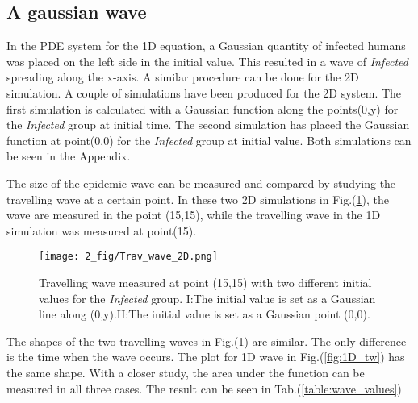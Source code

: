 \documentclass[%
twoside,                 %
final,                   %
chapterprefix=true,      %
open=right               %
10pt]{book}
\begin{document}
\subsection{A gaussian wave}
In the PDE system for the 1D equation, a Gaussian quantity of infected humans was placed on the left side in the initial value. This resulted in a wave of \emph{Infected} spreading along the x-axis. A similar procedure can be done for the 2D simulation. A couple of simulations have been produced for the 2D system. The first simulation is calculated with a Gaussian function along the points(0,y) for the \emph{Infected} group at initial time. The second simulation has placed the Gaussian function at point(0,0) for the \emph{Infected} group at initial value. Both simulations can be seen in the Appendix.  


\vspace{3mm}




\vspace{3mm}


The size of the epidemic wave can be measured and compared by studying the travelling wave at a certain point. In these two 2D simulations in Fig.(\ref{fig:2D_trav_wave}), the wave are measured in the point (15,15), while the travelling wave in the 1D simulation was measured at point(15). 


\begin{figure}[ht]
  \centerline{\texttt{[image: 2\_fig/Trav\_wave\_2D.png]}}
  \caption{
  \label{fig:2D_trav_wave} Travelling wave measured at point (15,15) with two different initial values for the \emph{Infected} group. I:The initial value is set as a Gaussian line along (0,y).II:The initial value is set as a Gaussian point (0,0).
  }
\end{figure}




\vspace{3mm}




\vspace{3mm}


The shapes of the two travelling waves in Fig.(\ref{fig:2D_trav_wave}) are similar. The only difference is the time when the wave occurs. The plot for 1D wave in Fig.(\ref{fig:1D_tw}) has the same shape. With a closer study, the area under the function can be measured in all three cases. The result can be seen in Tab.(\ref{table:wave_values})   
\end{document}
